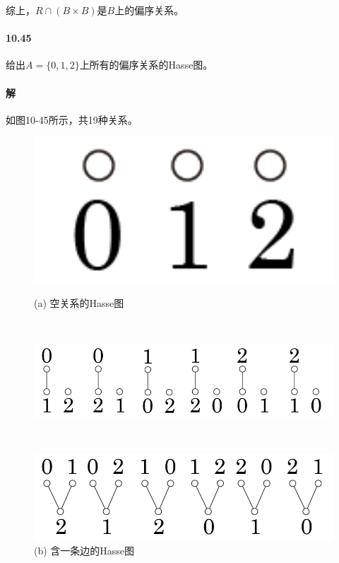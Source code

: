 \documentclass[UTF8]{ctexart}
\begin{document}
    综上，$R \cap (B \times B)$是$B$上的偏序关系。

\paragraph{10.45} \label{10.45}
    给出$A=\{0,1,2\}$上所有的偏序关系的Hasse图。

\paragraph{解}
    如图10-45所示，共19种关系。

    \begin{figure}[!htb]
        \centering
        \begin{minipage}[t]{0.111\textwidth}
        \centering
        \includegraphics[width=1\textwidth]{10-45-a.png}
        \caption*{(a) 空关系的Hasse图}
        \end{minipage}
        \\
        \begin{minipage}[t]{0.532\textwidth}
        \centering
        \includegraphics[width=1\textwidth]{10-45-b.png}
        \caption*{(b) 含一条边的Hasse图}
        \end{minipage}
        \\
        \begin{minipage}[t]{0.507\textwidth}
        \centering
        \includegraphics[width=1\textwidth]{10-45-c.png}

\end{minipage}
\end{figure}
\end{document}
